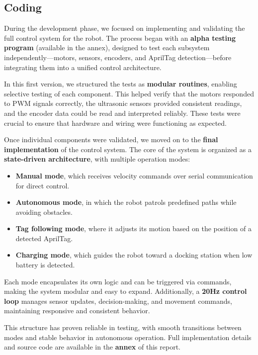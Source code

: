 \subsection{Coding}

During the development phase, we focused on implementing and validating the full control system for the robot. The process began with an \textbf{alpha testing program} (available in the annex), designed to test each subsystem independently—motors, sensors, encoders, and AprilTag detection—before integrating them into a unified control architecture.

In this first version, we structured the tests as \textbf{modular routines}, enabling selective testing of each component. This helped verify that the motors responded to PWM signals correctly, the ultrasonic sensors provided consistent readings, and the encoder data could be read and interpreted reliably. These tests were crucial to ensure that hardware and wiring were functioning as expected.

Once individual components were validated, we moved on to the \textbf{final implementation} of the control system. The core of the system is organized as a \textbf{state-driven architecture}, with multiple operation modes:

\begin{itemize}
    \item \textbf{Manual mode}, which receives velocity commands over serial communication for direct control.
    \item \textbf{Autonomous mode}, in which the robot patrols predefined paths while avoiding obstacles.
    \item \textbf{Tag following mode}, where it adjusts its motion based on the position of a detected AprilTag.
    \item \textbf{Charging mode}, which guides the robot toward a docking station when low battery is detected.
\end{itemize}

Each mode encapsulates its own logic and can be triggered via commands, making the system modular and easy to expand. Additionally, a \textbf{20Hz control loop} manages sensor updates, decision-making, and movement commands, maintaining responsive and consistent behavior.

This structure has proven reliable in testing, with smooth transitions between modes and stable behavior in autonomous operation. Full implementation details and source code are available in the \textbf{annex} of this report.
